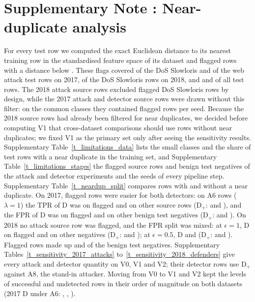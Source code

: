 \section*{Supplementary Note \suppNoteNeardup: Near-duplicate analysis}
\label{sec:si_neardup}
For every test row we computed the exact Euclidean distance to its nearest training row in the standardised feature
space of its dataset and flagged rows with a distance below \paramNDThr.
These flags covered \ndSlowlorisSeventeen{} of the DoS Slowloris and \ndWebSeventeen{} of the web attack test rows on
2017, \ndSlowlorisEighteen{} of the DoS Slowloris rows on 2018, and \ndAllSeventeen{} and \ndAllEighteen{} of all test
rows.
The 2018 attack source rows excluded flagged DoS Slowloris rows by design, while the 2017 attack and detector source
rows were drawn without this filter: on the \nCommonClasses{} common classes they contained \ndSrcCommonSeventeen{}
flagged rows per seed.
Because the 2018 source rows had already been filtered for near duplicates, we decided before computing V1 that
cross-dataset comparisons should use rows without near duplicates; we fixed V1 as the primary set only after seeing the
sensitivity results.
Supplementary Table~\ref{t_limitations_data} lists the small classes and the share of test rows with a near duplicate
in the training set, and Supplementary Table~\ref{t_limitations_stages} the flagged source rows and benign test
negatives of the attack and detector experiments and the seeds of every pipeline step.
Supplementary Table~\ref{t_neardup_split} compares rows with and without a near duplicate.
On 2017, flagged rows were easier for both detectors: on A6 rows ($\lambda = 1$) the TPR of D was \tprDNdSeventeen{} on
flagged and \tprDOtherSeventeen{} on other source rows (D$_+$: \tprDplusNdSeventeen{} and \tprDplusOtherSeventeen), and
the FPR of D was \fprDNdSeventeen{} on flagged and \fprDOtherSeventeen{} on other benign test negatives (D$_+$:
\fprDplusNdSeventeen{} and \fprDplusOtherSeventeen).
On 2018 no attack source row was flagged, and the FPR split was mixed: at $\epsilon = 1$, D \fprDNdEighteen{} on flagged
and \fprDOtherEighteen{} on other negatives (D$_+$: \fprDplusNdEighteen{} and \fprDplusOtherEighteen); at
$\epsilon = 0.5$, D \fprDNdEighteenHalf{} and \fprDOtherEighteenHalf{} (D$_+$: \fprDplusNdEighteenHalf{} and
\fprDplusOtherEighteenHalf).
Flagged rows made up \ndNegSeventeen{} and \ndNegEighteen{} of the benign test negatives.
Supplementary Tables~\ref{t_sensitivity_2017_attacks} to~\ref{t_sensitivity_2018_defenders} give every attack and
detector quantity on V0, V1 and V2; their detector rows use D$_+$ against A8, the stand-in attacker.
Moving from V0 to V1 and V2 kept the levels of successful and undetected rows in their order of magnitude on both
datasets (2017 D under A6: \undetDAsixOneVzeroSeventeen, \undetDAsixOneVoneSeventeen, \undetDAsixOneVtwoSeventeen).

